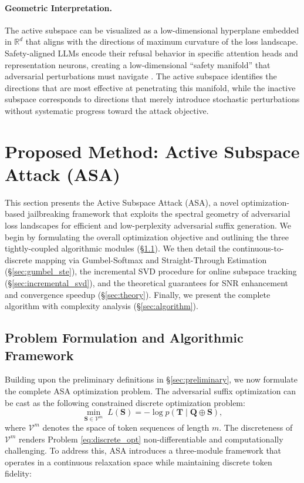 ﻿\documentclass[lettersize,journal]{IEEEtran}
\begin{document}
\paragraph{Geometric Interpretation.} The active subspace can be visualized as a low-dimensional hyperplane embedded in $\mathbb{R}^d$ that aligns with the directions of maximum curvature of the loss landscape. Safety-aligned LLMs encode their refusal behavior in specific attention heads and representation neurons, creating a low-dimensional ``safety manifold'' that adversarial perturbations must navigate \cite{zou2023universal}. The active subspace identifies the directions that are most effective at penetrating this manifold, while the inactive subspace corresponds to directions that merely introduce stochastic perturbations without systematic progress toward the attack objective.




\section{Proposed Method: Active Subspace Attack (ASA)}
\label{sec:method}

This section presents the Active Subspace Attack (ASA), a novel optimization-based jailbreaking framework that exploits the spectral geometry of adversarial loss landscapes for efficient and low-perplexity adversarial suffix generation. We begin by formulating the overall optimization objective and outlining the three tightly-coupled algorithmic modules (\S\ref{sec:framework}). We then detail the continuous-to-discrete mapping via Gumbel-Softmax and Straight-Through Estimation (\S\ref{sec:gumbel_ste}), the incremental SVD procedure for online subspace tracking (\S\ref{sec:incremental_svd}), and the theoretical guarantees for SNR enhancement and convergence speedup (\S\ref{sec:theory}). Finally, we present the complete algorithm with complexity analysis (\S\ref{sec:algorithm}).

\subsection{Problem Formulation and Algorithmic Framework}
\label{sec:framework}

Building upon the preliminary definitions in \S\ref{sec:preliminary}, we now formulate the complete ASA optimization problem. The adversarial suffix optimization can be cast as the following constrained discrete optimization problem:
\begin{equation}
\label{eq:discrete_opt}
\min_{\mathbf{S} \in \mathcal{V}^m} \; L(\mathbf{S}) = -\log p(\mathbf{T} \mid \mathbf{Q} \oplus \mathbf{S}),
\end{equation}
where $\mathcal{V}^m$ denotes the space of token sequences of length $m$. The discreteness of $\mathcal{V}^m$ renders Problem \eqref{eq:discrete_opt} non-differentiable and computationally challenging. To address this, ASA introduces a three-module framework that operates in a continuous relaxation space while maintaining discrete token fidelity:
\end{document}
